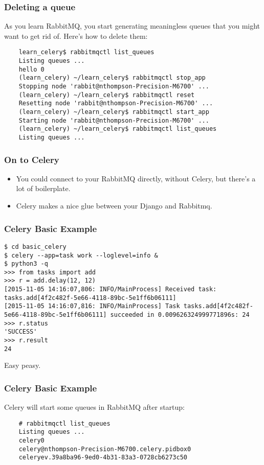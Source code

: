 \documentclass[9pt]{beamer}
\begin{document}
\begin{frame}[fragile]
  \frametitle{Deleting a queue}
  As you learn RabbitMQ, you start generating meaningless queues that you might want to get rid of. Here's how to delete them:
  \begin{verbatim}
    learn_celery$ rabbitmqctl list_queues
    Listing queues ...
    hello 0
    (learn_celery) ~/learn_celery$ rabbitmqctl stop_app
    Stopping node 'rabbit@nthompson-Precision-M6700' ...
    (learn_celery) ~/learn_celery$ rabbitmqctl reset
    Resetting node 'rabbit@nthompson-Precision-M6700' ...
    (learn_celery) ~/learn_celery$ rabbitmqctl start_app
    Starting node 'rabbit@nthompson-Precision-M6700' ...
    (learn_celery) ~/learn_celery$ rabbitmqctl list_queues
    Listing queues ...
  \end{verbatim}
\end{frame}

\begin{frame}[fragile]
  \frametitle{On to Celery}
  \begin{itemize}
  \item You could connect to your RabbitMQ directly, without Celery, but there's a lot of boilerplate.
  \item Celery makes a nice glue between your Django and Rabbitmq.
  \end{itemize}
\end{frame}

\begin{frame}[fragile]
  \frametitle{Celery Basic Example}
  \begin{verbatim}
$ cd basic_celery
$ celery --app=task work --loglevel=info &
$ python3 -q
>>> from tasks import add
>>> r = add.delay(12, 12)
[2015-11-05 14:16:07,806: INFO/MainProcess] Received task: tasks.add[4f2c482f-5e66-4118-89bc-5e1ff6b06111]
[2015-11-05 14:16:07,816: INFO/MainProcess] Task tasks.add[4f2c482f-5e66-4118-89bc-5e1ff6b06111] succeeded in 0.009626324999771896s: 24
>>> r.status
'SUCCESS'
>>> r.result
24
  \end{verbatim}
  Easy peasy.
\end{frame}

\begin{frame}[fragile]
  \frametitle{Celery Basic Example}
  Celery will start some queues in RabbitMQ after startup:
  \begin{verbatim}
    # rabbitmqctl list_queues
    Listing queues ...
    celery0
    celery@nthompson-Precision-M6700.celery.pidbox0
    celeryev.39a8ba96-9ed0-4b31-83a3-0728cb6273c50
  \end{verbatim}
\end{frame}
\end{document}
